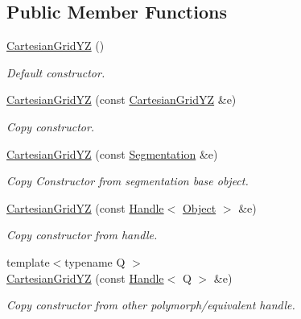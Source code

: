 \subsection*{Public Member Functions}
\begin{DoxyCompactItemize}
\item 
\hyperlink{class_d_d4hep_1_1_geometry_1_1_cartesian_grid_y_z_aed939b9098470846e32794f3d865ff7b}{CartesianGridYZ} ()
\begin{DoxyCompactList}\small\item\em Default constructor. \item\end{DoxyCompactList}\item 
\hyperlink{class_d_d4hep_1_1_geometry_1_1_cartesian_grid_y_z_a137cf0fec563952ae183d5ce5675dbe2}{CartesianGridYZ} (const \hyperlink{class_d_d4hep_1_1_geometry_1_1_cartesian_grid_y_z}{CartesianGridYZ} \&e)
\begin{DoxyCompactList}\small\item\em Copy constructor. \item\end{DoxyCompactList}\item 
\hyperlink{class_d_d4hep_1_1_geometry_1_1_cartesian_grid_y_z_ae3f9ea2435ad2c614ef57d1acd4bef8d}{CartesianGridYZ} (const \hyperlink{class_d_d4hep_1_1_geometry_1_1_segmentation}{Segmentation} \&e)
\begin{DoxyCompactList}\small\item\em Copy Constructor from segmentation base object. \item\end{DoxyCompactList}\item 
\hyperlink{class_d_d4hep_1_1_geometry_1_1_cartesian_grid_y_z_ab68e61e001c4eea7d4e6aa57dc7f99e4}{CartesianGridYZ} (const \hyperlink{class_d_d4hep_1_1_handle}{Handle}$<$ \hyperlink{class_t}{Object} $>$ \&e)
\begin{DoxyCompactList}\small\item\em Copy constructor from handle. \item\end{DoxyCompactList}\item 
{\footnotesize template$<$typename Q $>$ }\\\hyperlink{class_d_d4hep_1_1_geometry_1_1_cartesian_grid_y_z_a5b249688197afc0b14a2ec083d0a9b1f}{CartesianGridYZ} (const \hyperlink{class_d_d4hep_1_1_handle}{Handle}$<$ Q $>$ \&e)
\begin{DoxyCompactList}\small\item\em Copy constructor from other polymorph/equivalent handle. \item\end{DoxyCompactList}\item 

\end{DoxyCompactItemize}
